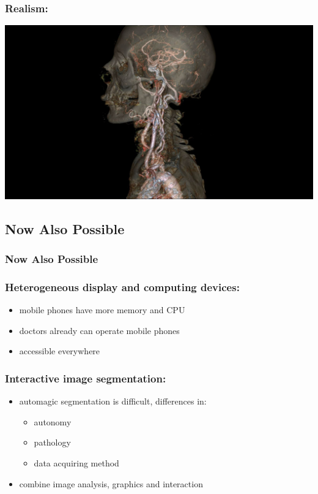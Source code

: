 \documentclass{beamer}
\begin{document}
\begin{frame}
	\frametitle{Realism:}
	\includegraphics[width=\textwidth]{images/realistic_transparent}
\end{frame}


\subsection{Now Also Possible}
\begin{frame}
	\frametitle{Now Also Possible}
\end{frame}

\begin{frame}
	\frametitle{Heterogeneous display and computing devices:}
	\begin{itemize}
		\item mobile phones have more memory and CPU
		\item doctors already can operate mobile phones
		\item accessible everywhere
	\end{itemize}
\end{frame}

\begin{frame}
	\frametitle{Interactive image segmentation:}
	\begin{itemize}
		\item automagic segmentation is difficult, differences in:
			\begin{itemize}
				\item autonomy
				\item pathology
				\item data acquiring method
			\end{itemize}
		\item combine image analysis, graphics and interaction
	\end{itemize}
\end{frame}
\end{document}
